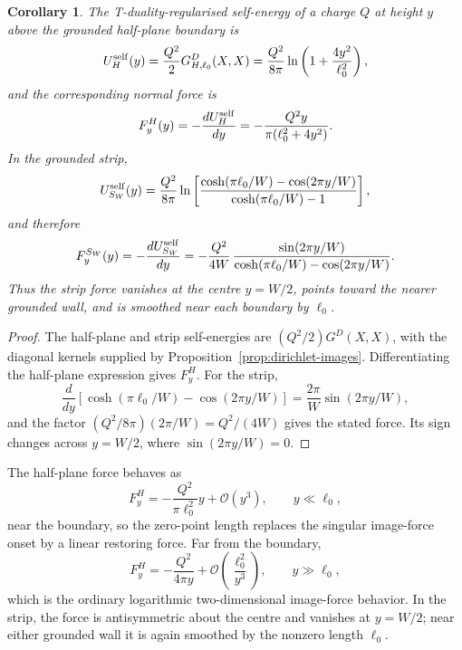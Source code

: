 \documentclass[openacc]{rsproca_new}%
\newtheorem{corollary}{\bf Corollary}[section]
\begin{document}
\begin{corollary}\label{cor:boundary-self-forces}
The T-duality-regularised self-energy of a charge \(Q\) at height \(y\) above the grounded half-plane boundary is
\begin{equation}
  U_H^{\rm self}(y)=\frac{Q^2}{2}G_{H,\ell_0}^D(X,X)
  =\frac{Q^2}{8\pi}\ln\left(1+\frac{4y^2}{\ell_0^2}\right),
\end{equation}
and the corresponding normal force is
\begin{equation}
  F_y^H(y)=-\frac{dU_H^{\rm self}}{dy}
  =-\frac{Q^2y}{\pi(\ell_0^2+4y^2)}.
\end{equation}
In the grounded strip,
\begin{equation}
  U_{S_W}^{\rm self}(y)=\frac{Q^2}{8\pi}\ln\left[
  \frac{\cosh(\pi\ell_0/W)-\cos(2\pi y/W)}{\cosh(\pi\ell_0/W)-1}\right],
\end{equation}
and therefore
\begin{equation}
  F_y^{S_W}(y)=-\frac{dU_{S_W}^{\rm self}}{dy}
  =-\frac{Q^2}{4W}\,
  \frac{\sin(2\pi y/W)}{\cosh(\pi\ell_0/W)-\cos(2\pi y/W)}.
\end{equation}
Thus the strip force vanishes at the centre \(y=W/2\), points toward the nearer grounded wall, and is smoothed near each boundary by \(\ell_0\).
\end{corollary}

\begin{proof}
The half-plane and strip self-energies are \((Q^2/2)G^D(X,X)\), with the diagonal kernels supplied by Proposition~\ref{prop:dirichlet-images}. Differentiating the half-plane expression gives \(F_y^H\). For the strip,
\begin{equation}
  \frac{d}{dy}\left[\cosh(\pi\ell_0/W)-\cos(2\pi y/W)\right]
  =\frac{2\pi}{W}\sin(2\pi y/W),
\end{equation}
and the factor \((Q^2/8\pi)(2\pi/W)=Q^2/(4W)\) gives the stated force. Its sign changes across \(y=W/2\), where \(\sin(2\pi y/W)=0\).
\end{proof}

The half-plane force behaves as
\begin{equation}
  F_y^H=-\frac{Q^2}{\pi\ell_0^2}y+\mathcal O(y^3),\qquad y\ll\ell_0,
\end{equation}
near the boundary, so the zero-point length replaces the singular image-force onset by a linear restoring force. Far from the boundary,
\begin{equation}
  F_y^H=-\frac{Q^2}{4\pi y}+\mathcal O\!\left(\frac{\ell_0^2}{y^3}\right),\qquad y\gg\ell_0,
\end{equation}
which is the ordinary logarithmic two-dimensional image-force behavior. In the strip, the force is antisymmetric about the centre and vanishes at \(y=W/2\); near either grounded wall it is again smoothed by the nonzero length \(\ell_0\).
\end{document}
